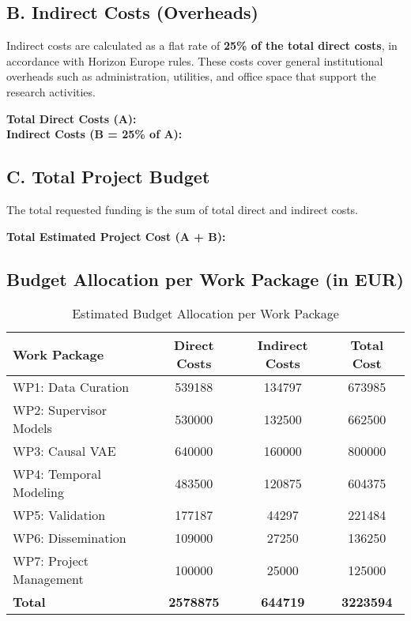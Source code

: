 \subsection*{B. Indirect Costs (Overheads)}
Indirect costs are calculated as a flat rate of \textbf{25\% of the total direct costs}, in accordance with Horizon Europe rules. These costs cover general institutional overheads such as administration, utilities, and office space that support the research activities.

\textbf{Total Direct Costs (A): } \\
\textbf{Indirect Costs (B = 25\% of A): }

\subsection*{C. Total Project Budget}
The total requested funding is the sum of total direct and indirect costs.

\textbf{Total Estimated Project Cost (A + B): }

\subsection*{Budget Allocation per Work Package (in EUR)}

\begin{table}[H]
\centering
\caption{Estimated Budget Allocation per Work Package}
\label{tab:budget_wp}
\begin{tabular}{lS[table-format=7.0]S[table-format=7.0]S[table-format=7.0]}
\toprule
\textbf{Work Package} & \textbf{Direct Costs} & \textbf{Indirect Costs} & \textbf{Total Cost} \\
\midrule
WP1: Data Curation & 539188 & 134797 & 673985 \\
WP2: Supervisor Models & 530000 & 132500 & 662500 \\
WP3: Causal VAE & 640000 & 160000 & 800000 \\
WP4: Temporal Modeling & 483500 & 120875 & 604375 \\
WP5: Validation & 177187 & 44297 & 221484 \\
WP6: Dissemination & 109000 & 27250 & 136250 \\
WP7: Project Management & 100000 & 25000 & 125000 \\
\midrule
\textbf{Total} & \textbf{2578875} & \textbf{644719} & \textbf{3223594} \\
\bottomrule
\end{tabular}
\end{table}